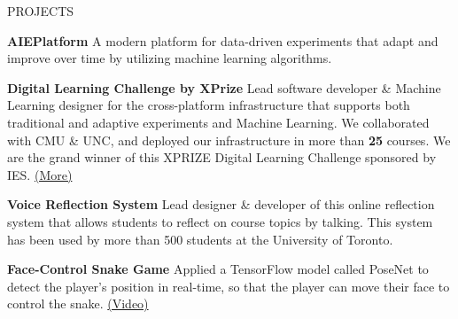 \documentclass{resume} %
\begin{document}
\begin{rSection}{PROJECTS}
\vspace{-1.25em}
\item \textbf{AIEPlatform} {A modern platform for data-driven experiments that adapt and improve over time by utilizing machine learning algorithms.}

\item \textbf{Digital Learning Challenge by XPrize} {Lead software developer \& Machine Learning designer for the cross-platform infrastructure that supports both traditional and adaptive experiments and Machine Learning. We collaborated with CMU \& UNC, and deployed our infrastructure in more than \textbf{25} courses. We are the grand winner of this XPRIZE Digital Learning Challenge sponsored by IES. \href{https://www.xprize.org/challenge/digitallearning/finalist-teams}{(More)}}

\item \textbf{Voice Reflection System} {Lead designer \& developer of this online reflection system that allows students to reflect on course topics by talking. This system has been used by more than 500 students at the University of Toronto.}

\item \textbf{Face-Control Snake Game} {Applied a TensorFlow model called PoseNet to detect the player's position in real-time, so that the player can move their face to control the snake. \href{https://www.youtube.com/watch?v=Zn_5Oy7DZJw}{(Video)}}
\end{rSection} 
\end{document}
